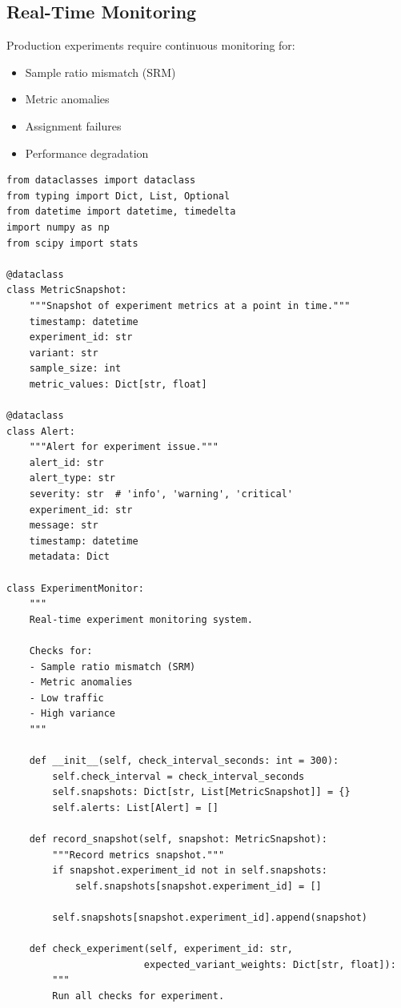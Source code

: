 \subsection{Real-Time Monitoring}

Production experiments require continuous monitoring for:
\begin{itemize}
    \item Sample ratio mismatch (SRM)
    \item Metric anomalies
    \item Assignment failures
    \item Performance degradation
\end{itemize}

\lstset{language=Python, caption=Real-Time Experiment Monitor}
\begin{lstlisting}
from dataclasses import dataclass
from typing import Dict, List, Optional
from datetime import datetime, timedelta
import numpy as np
from scipy import stats

@dataclass
class MetricSnapshot:
    """Snapshot of experiment metrics at a point in time."""
    timestamp: datetime
    experiment_id: str
    variant: str
    sample_size: int
    metric_values: Dict[str, float]

@dataclass
class Alert:
    """Alert for experiment issue."""
    alert_id: str
    alert_type: str
    severity: str  # 'info', 'warning', 'critical'
    experiment_id: str
    message: str
    timestamp: datetime
    metadata: Dict

class ExperimentMonitor:
    """
    Real-time experiment monitoring system.

    Checks for:
    - Sample ratio mismatch (SRM)
    - Metric anomalies
    - Low traffic
    - High variance
    """

    def __init__(self, check_interval_seconds: int = 300):
        self.check_interval = check_interval_seconds
        self.snapshots: Dict[str, List[MetricSnapshot]] = {}
        self.alerts: List[Alert] = []

    def record_snapshot(self, snapshot: MetricSnapshot):
        """Record metrics snapshot."""
        if snapshot.experiment_id not in self.snapshots:
            self.snapshots[snapshot.experiment_id] = []

        self.snapshots[snapshot.experiment_id].append(snapshot)

    def check_experiment(self, experiment_id: str,
                        expected_variant_weights: Dict[str, float]):
        """
        Run all checks for experiment.


\end{lstlisting}
